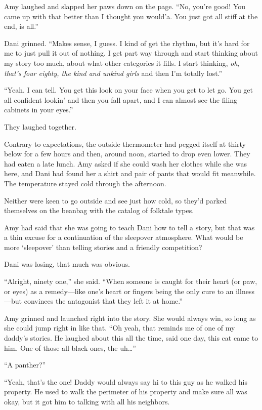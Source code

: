 Amy laughed and slapped her paws down on the page. ``No, you're good! You came up with that better than I thought you would'a. You just got all stiff at the end, is all.''

Dani grinned. ``Makes sense, I guess. I kind of get the rhythm, but it's hard for me to just pull it out of nothing. I get part way through and start thinking about my story too much, about what other categories it fills. I start thinking, \emph{oh, that's four eighty, the kind and unkind girls} and then I'm totally lost.''

``Yeah. I can tell. You get this look on your face when you get to let go. You get all confident lookin' and then you fall apart, and I can almost see the filing cabinets in your eyes.''

They laughed together.

Contrary to expectations, the outside thermometer had pegged itself at thirty below for a few hours and then, around noon, started to drop even lower. They had eaten a late lunch. Amy asked if she could wash her clothes while she was here, and Dani had found her a shirt and pair of pants that would fit meanwhile. The temperature stayed cold through the afternoon.

Neither were keen to go outside and see just how cold, so they'd parked themselves on the beanbag with the catalog of folktale types.

Amy had said that she was going to teach Dani how to tell a story, but that was a thin excuse for a continuation of the sleepover atmosphere. What would be more `sleepover' than telling stories and a friendly competition?

Dani was losing, that much was obvious.

``Alright, ninety one,'' she said. ``When someone is caught for their heart (or paw, or eyes) as a remedy---like one's heart or fingers being the only cure to an illness---but convinces the antagonist that they left it at home.''

Amy grinned and launched right into the story. She would always win, so long as she could jump right in like that. ``Oh yeah, that reminds me of one of my daddy's stories. He laughed about this all the time, said one day, this cat came to him. One of those all black ones, the uh\ldots{}''

``A panther?''

``Yeah, that's the one! Daddy would always say hi to this guy as he walked his property. He used to walk the perimeter of his property and make sure all was okay, but it got him to talking with all his neighbors.

